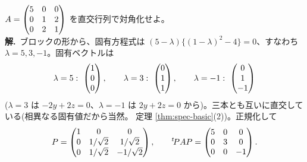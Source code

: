 \begin{rei}[例題・標準($3$ 次の直交対角化)]\label{rei:spec-3x3}
$A = \begin{pmatrix}5 & 0 & 0 \\ 0 & 1 & 2 \\ 0 & 2 & 1\end{pmatrix}$ を直交行列で対角化せよ。\\
\textbf{解.}\ ブロックの形から、固有方程式は
$(5 - \lambda)\{(1 - \lambda)^2 - 4\} = 0$、すなわち
$\lambda = 5, 3, -1$。固有ベクトルは
\[
\lambda = 5:\ \begin{pmatrix}1 \\ 0 \\ 0\end{pmatrix}, \qquad
\lambda = 3:\ \begin{pmatrix}0 \\ 1 \\ 1\end{pmatrix}, \qquad
\lambda = -1:\ \begin{pmatrix}0 \\ 1 \\ -1\end{pmatrix}
\]
($\lambda = 3$ は $-2y + 2z = 0$、$\lambda = -1$ は $2y + 2z = 0$
から)。三本とも互いに直交している(相異なる固有値だから当然。
定理 \ref{thm:spec-basic}(2))。正規化して
\[
P = \begin{pmatrix}1 & 0 & 0 \\ 0 & 1/\sqrt{2} & 1/\sqrt{2} \\ 0 & 1/\sqrt{2} & -1/\sqrt{2}\end{pmatrix},
\qquad
{}^t\!PAP = \begin{pmatrix}5 & 0 & 0 \\ 0 & 3 & 0 \\ 0 & 0 & -1\end{pmatrix}.
\]
\end{rei}

